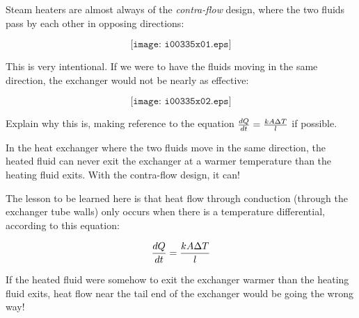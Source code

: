 

Steam heaters are almost always of the {\it contra-flow} design, where the two fluids pass by each other in opposing directions:

$$\texttt{[image: i00335x01.eps]}$$

This is very intentional.  If we were to have the fluids moving in the same direction, the exchanger would not be nearly as effective:

$$\texttt{[image: i00335x02.eps]}$$

\vskip 10pt

Explain why this is, making reference to the equation ${dQ \over dt} = {kA {\Delta T} \over l}$ if possible.







In the heat exchanger where the two fluids move in the same direction, the heated fluid can never exit the exchanger at a warmer temperature than the heating fluid exits.  With the contra-flow design, it can!







The lesson to be learned here is that heat flow through conduction (through the exchanger tube walls) only occurs when there is a temperature differential, according to this equation:

$${dQ \over dt} = {kA {\Delta T} \over l}$$

If the heated fluid were somehow to exit the exchanger warmer than the heating fluid exits, heat flow near the tail end of the exchanger would be going the wrong way!




